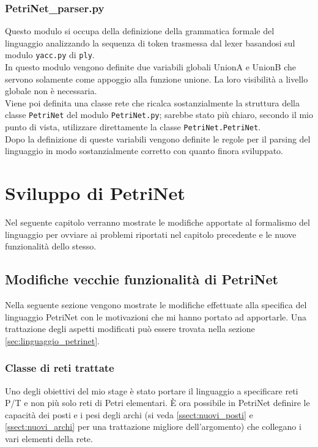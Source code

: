 \documentclass[italian,12pt]{book}
\begin{document}
\subsection{PetriNet\_parser.py}
Questo modulo si occupa della definizione della grammatica formale del linguaggio analizzando la 
sequenza di token trasmessa dal lexer basandosi sul modulo {\tt yacc.py} di {\tt ply}.\\
In questo modulo vengono definite due variabili globali UnionA e UnionB che servono solamente come
appoggio alla funzione unione. La loro visibilità a livello globale non è necessaria.\\
Viene poi definita una classe rete che ricalca sostanzialmente la struttura della classe 
{\tt PetriNet} del modulo {\tt PetriNet.py}; sarebbe stato più chiaro, secondo il mio
punto di vista, utilizzare direttamente la classe {\tt PetriNet.PetriNet}.\\
Dopo la definizione di queste variabili vengono definite le regole per il parsing del linguaggio 
in modo sostanzialmente corretto con quanto finora sviluppato.


\chapter{Sviluppo di PetriNet}
Nel seguente capitolo verranno mostrate le modifiche apportate al formalismo del linguaggio per ovviare 
ai problemi riportati nel capitolo precedente e le nuove funzionalità dello stesso.

\section{Modifiche vecchie funzionalità di PetriNet}
Nella seguente sezione vengono mostrate le modifiche effettuate alla specifica del linguaggio 
PetriNet con le motivazioni che mi hanno portato ad apportarle. Una trattazione degli aspetti 
modificati può essere trovata nella sezione \ref{sec:linguaggio_petrinet}.

\subsection{Classe di reti trattate}\label{ssect:classe_di_reti_trattate_new}
Uno degli obiettivi del mio stage è stato portare il linguaggio a specificare reti P/T e non più 
solo reti di Petri elementari. È ora possibile in PetriNet definire le capacità dei posti 
e i pesi degli archi (si veda \ref{ssect:nuovi_posti} e \ref{ssect:nuovi_archi} per una 
trattazione migliore dell'argomento) che collegano i vari elementi della rete.
\end{document}
